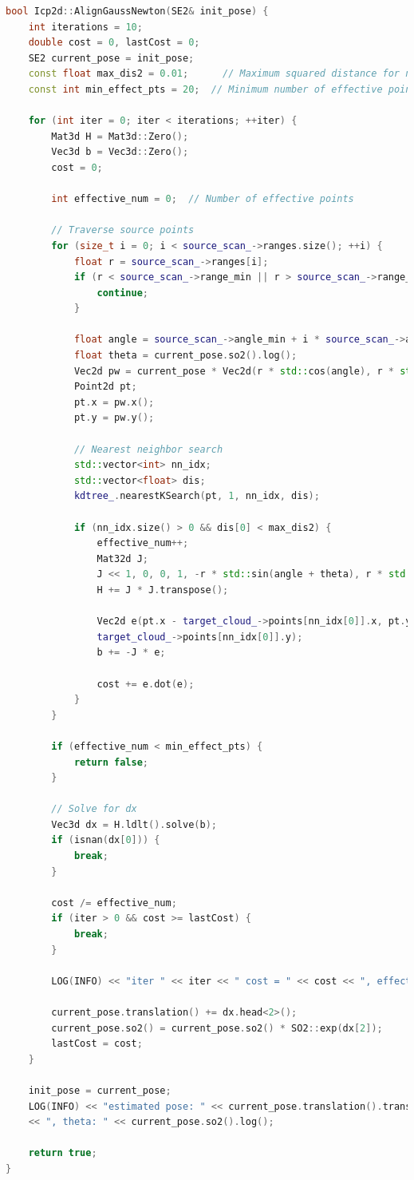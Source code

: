 \begin{lstlisting}[language=c++, caption=src/ch6/icp\_2d.cc]  
bool Icp2d::AlignGaussNewton(SE2& init_pose) {  
	int iterations = 10;  
	double cost = 0, lastCost = 0;  
	SE2 current_pose = init_pose;  
	const float max_dis2 = 0.01;      // Maximum squared distance for nearest neighbors  
	const int min_effect_pts = 20;  // Minimum number of effective points  
	
	for (int iter = 0; iter < iterations; ++iter) {  
		Mat3d H = Mat3d::Zero();  
		Vec3d b = Vec3d::Zero();  
		cost = 0;  
		
		int effective_num = 0;  // Number of effective points  
		
		// Traverse source points  
		for (size_t i = 0; i < source_scan_->ranges.size(); ++i) {  
			float r = source_scan_->ranges[i];  
			if (r < source_scan_->range_min || r > source_scan_->range_max) {  
				continue;  
			}  
			
			float angle = source_scan_->angle_min + i * source_scan_->angle_increment;  
			float theta = current_pose.so2().log();  
			Vec2d pw = current_pose * Vec2d(r * std::cos(angle), r * std::sin(angle));  
			Point2d pt;  
			pt.x = pw.x();  
			pt.y = pw.y();  
			
			// Nearest neighbor search  
			std::vector<int> nn_idx;  
			std::vector<float> dis;  
			kdtree_.nearestKSearch(pt, 1, nn_idx, dis);  
			
			if (nn_idx.size() > 0 && dis[0] < max_dis2) {  
				effective_num++;  
				Mat32d J;  
				J << 1, 0, 0, 1, -r * std::sin(angle + theta), r * std::cos(angle + theta);  
				H += J * J.transpose();  
				
				Vec2d e(pt.x - target_cloud_->points[nn_idx[0]].x, pt.y -  
				target_cloud_->points[nn_idx[0]].y);  
				b += -J * e;  
				
				cost += e.dot(e);  
			}  
		}  
		
		if (effective_num < min_effect_pts) {  
			return false;  
		}  
		
		// Solve for dx  
		Vec3d dx = H.ldlt().solve(b);  
		if (isnan(dx[0])) {  
			break;  
		}  
		
		cost /= effective_num;  
		if (iter > 0 && cost >= lastCost) {  
			break;  
		}  
		
		LOG(INFO) << "iter " << iter << " cost = " << cost << ", effect num: " << effective_num;  
		
		current_pose.translation() += dx.head<2>();  
		current_pose.so2() = current_pose.so2() * SO2::exp(dx[2]);  
		lastCost = cost;  
	}  
	
	init_pose = current_pose;  
	LOG(INFO) << "estimated pose: " << current_pose.translation().transpose()  
	<< ", theta: " << current_pose.so2().log();  
	
	return true;  
}  
\end{lstlisting}  

